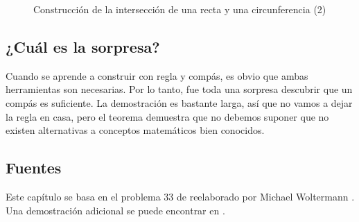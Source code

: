 \begin{figure}[b]
\begin{center}
\end{center}
\caption{Construcción de la intersección de una recta y una circunferencia (2)}\label{f.compass-circle5}
\end{figure}

\subsection*{¿Cuál es la sorpresa?}

Cuando se aprende a construir con regla y compás, es obvio que ambas herramientas son necesarias. Por lo tanto, fue toda una sorpresa descubrir que un compás es suficiente. La demostración es bastante larga, así que no vamos a dejar la regla en casa, pero el teorema demuestra que no debemos suponer que no existen alternativas a conceptos matemáticos bien conocidos.

\subsection*{Fuentes}

Este capítulo se basa en el problema $33$ de \cite{dorrie1} reelaborado por Michael Woltermann \cite{dorrie2}. Una demostración adicional se puede encontrar en \cite{mm}.
